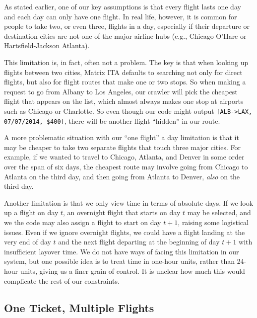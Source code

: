 \documentclass{article}
\begin{document}
As stated earlier, one of our key assumptions is that every flight lasts one day and each day can only have one flight. In real life, however, it is
common for people to take two, or even three, flights in a day, especially if their departure or destination cities are not one of the major airline
hubs (e.g., Chicago O'Hare or Hartsfield-Jackson Atlanta).

This limitation is, in fact, often not a problem. The key is that when looking up flights between two cities, Matrix ITA defaults to searching not
only for direct flights, but also for flight routes that make one or two stops. So when making a request to go from Albany to Los Angeles, our crawler
will pick the cheapest flight that appears on the list, which almost always makes one stop at airports such as Chicago or Charlotte. So even though
our code might output \texttt{[ALB->LAX, 07/07/2014, \$400]}, there will be another flight ``hidden'' in our route.

A more problematic situation with our ``one flight'' a day limitation is that it may be cheaper to take two separate flights that touch three major
cities. For example, if we wanted to travel to Chicago, Atlanta, and Denver in some order over the span of six days, the cheapest route may involve
going from Chicago to Atlanta on the third day, and then going from Atlanta to Denver, \emph{also} on the third day.

Another limitation is that we only view time in terms of absolute days. If we look up a flight on day $t$, an overnight flight that starts on day $t$
may be selected, and we the code may also assign a flight to start on day $t+1$, raising some logistical issues. Even if we ignore overnight flights,
we could have a flight landing at the very end of day $t$ and the next flight departing at the beginning of day $t+1$ with insufficient layover time.
We do not have ways of facing this limitation in our system, but one possible idea is to treat time in one-hour units, rather than 24-hour units,
giving us a finer grain of control. It is unclear how much this would complicate the rest of our constraints.

\subsection{One Ticket, Multiple Flights}
\end{document}
